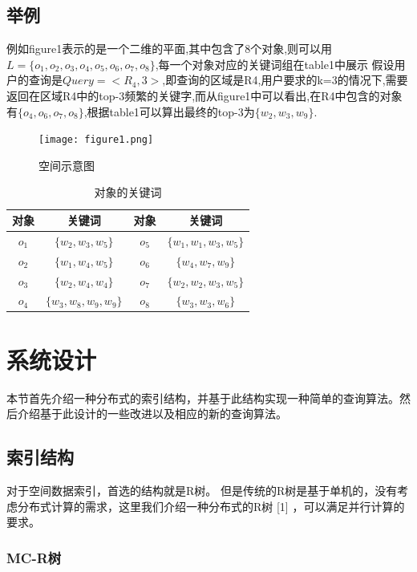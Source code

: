 \documentclass{elegantpaper}
\begin{document}
\subsection{举例}

例如figure1表示的是一个二维的平面,其中包含了8个对象,则可以用$L=\{o_1,o_2,o_3,o_4,o_5,o_6,o_7,o_8\}$,每一个对象对应的关键词组在table1中展示
假设用户的查询是$Query=<R_4,3>$,即查询的区域是R4,用户要求的k=3的情况下,需要返回在区域R4中的top-3频繁的关键字,而从figure1中可以看出,在R4中包含的对象有$\{o_4,o_6,o_7,o_8\}$,根据table1可以算出最终的top-3为$\{w_2,w_3,w_9\}$.

\begin{figure}[!ht]
	\centering
	\texttt{[image: figure1.png]}
	\caption{空间示意图\label{fig:figure1}}
\end{figure}

\begin{table}[!htbp]
    \small
    \centering
    \caption{对象的关键词}
      \begin{tabular}{cccc}
      对象&关键词&对象&关键词\\
      \hline
      $o_1$   & $\{w_2,w_3,w_5\}$ & $o_5$&$\{w_1,w_1,w_3,w_5\}$\\
      $o_2$   & $\{w_1,w_4,w_5\}$ & $o_6$&$\{w_4,w_7,w_9\}$\\
      $o_3$   & $\{w_2,w_4,w_4\}$ & $o_7$&$\{w_2,w_2,w_3,w_5\}$\\
      $o_4$   & $\{w_3,w_8,w_9,w_9\}$ & $o_8$&$\{w_3,w_3,w_6\}$\\
      \end{tabular}
\end{table}

\section{系统设计}

本节首先介绍一种分布式的索引结构，并基于此结构实现一种简单的查询算法。然后介绍基于此设计的一些改进以及相应的新的查询算法。

\subsection{索引结构}

对于空间数据索引，首选的结构就是R树。
但是传统的R树是基于单机的，没有考虑分布式计算的需求，这里我们介绍一种分布式的R树 [1] ，可以满足并行计算的要求。

\subsubsection{MC-R树}
\end{document}
